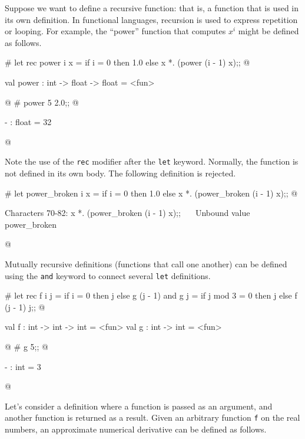Suppose we want to define a recursive function: that is, a function
that is used in its own definition.  In functional languages,
recursion is used to express repetition or looping.  For example, the
``power'' function that computes $x^i$ might be defined as follows.

\begin{ocaml}
# let rec power i x =
     if i = 0 then
        1.0
     else
        x *. (power (i - 1) x);;
@
\begin{topoutput}
val power : int -> float -> float = <fun>
\end{topoutput}
@
# power 5 2.0;;
@
\begin{topoutput}
- : float = 32
\end{topoutput}
@
\end{ocaml}
%
Note the use of the \hbox{\lstinline/rec/} modifier after the \hbox{\lstinline/let/} keyword.
Normally, the function is not defined in its own body.  The
following definition is rejected.

\begin{ocaml}
# let power_broken i x =
     if i = 0 then
        1.0
     else
        x *. (power_broken (i - 1) x);;
@
\begin{toperror}
Characters 70-82:
        x *. (power_broken (i - 1) x);;
              ^^^^^^^^^^^^
Unbound value power_broken
\end{toperror}
@
\end{ocaml}
%
\label{keyword:and}
Mutually recursive definitions (functions that call one another) can
be defined using the \texttt{and} keyword to connect several \texttt{let}
definitions.

\begin{ocaml}
# let rec f i j =
     if i = 0 then
        j
     else
        g (j - 1)
  and g j =
     if j mod 3 = 0 then
        j
     else
        f (j - 1) j;;
@
\begin{topoutput}
val f : int -> int -> int = <fun>
val g : int -> int = <fun>
\end{topoutput}
@
# g 5;;
@
\begin{topoutput}
- : int = 3
\end{topoutput}
@
\end{ocaml}


Let's consider a definition where a function is passed as an
argument, and another function is returned as a result.  Given an arbitrary
function \hbox{\lstinline/f/} on the real numbers, an approximate numerical derivative can be defined
as follows.


